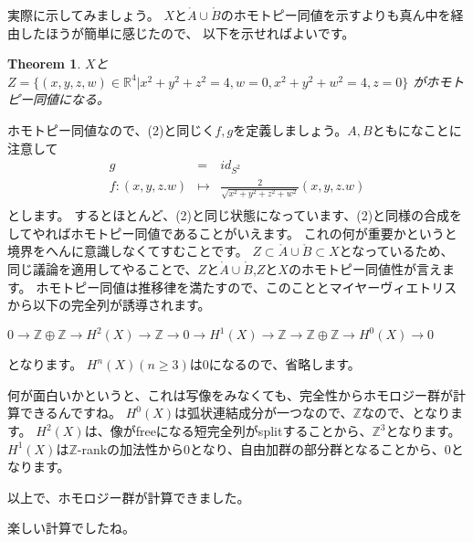 \documentclass{ujarticle}
\newtheorem{thm}{Theorem}[section]
\begin{document}
実際に示してみましょう。
$X$と$\mathring{A} \cup \mathring{B}$のホモトピー同値を示すよりも真ん中を経由したほうが簡単に感じたので、
以下を示せればよいです。
\begin{thm}
$X$と$Z=\{ (x,y,z,w) \in \mathbb{R}^4 |  x^2 + y^2 + z^2 = 4 ,w =0 , x^2 +y^2 + w^2 =4,z=0   \}$
がホモトピー同値になる。
\end{thm}

ホモトピー同値なので、(2)と同じく$f,g$を定義しましょう。$A,B$ともになことに注意して
\begin{eqnarray*}
  g &=& id_{S^2}　 \\
  f :(x,y,z.w) &\mapsto& \frac{2}{\sqrt{x^2 + y^2 + z^2 +w^2}}(x,y,z.w)  \\
\end{eqnarray*}
とします。
するとほとんど、(2)と同じ状態になっています、(2)と同様の合成をしてやればホモトピー同値であることがいえます。
これの何が重要かというと境界をへんに意識しなくてすむことです。
$Z \subset \mathring{A} \cup \mathring{B} \subset X$となっているため、
同じ議論を適用してやることで、$Z$と$\mathring{A} \cup \mathring{B} $,$Z$と$X$のホモトピー同値性が言えます。
ホモトピー同値は推移律を満たすので、このこととマイヤーヴィエトリスから以下の完全列が誘導されます。

$ 0 \to \mathbb{Z} \oplus \mathbb{Z} \to H^2( X) \to \mathbb{Z} \to 0
\to H^1(X) \to \mathbb{Z} \to \mathbb{Z} \oplus \mathbb{Z} \to H^0(X) \to 0$

となります。
$H^n(X)(n \ge 3)$は$0$になるので、省略します。

何が面白いかというと、これは写像をみなくても、完全性からホモロジー群が計算できるんですね。
$H^0(X)$は弧状連結成分が一つなので、$\mathbb{Z}$なので、となります。
$H^2(X)$は、像がfreeになる短完全列がsplitすることから、$\mathbb{Z}^3$となります。
$H^1(X)$は$\mathbb{Z}$-rankの加法性から0となり、自由加群の部分群となることから、$0$となります。

以上で、ホモロジー群が計算できました。

楽しい計算でしたね。
\end{document}
